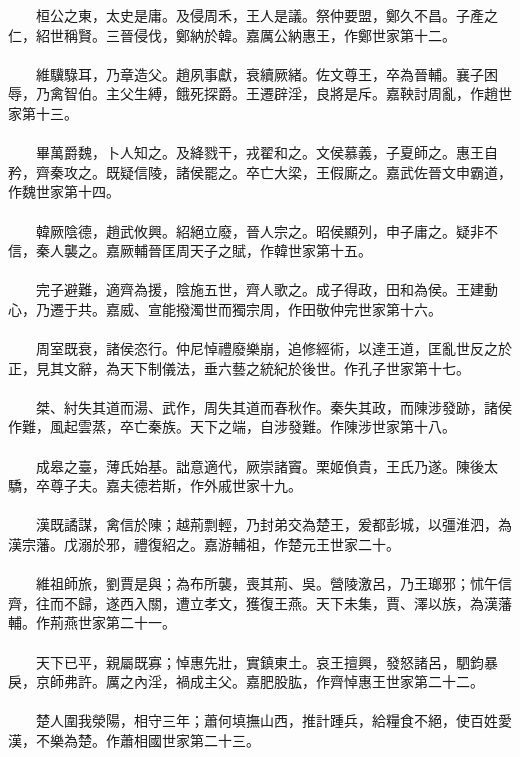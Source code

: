 　　桓公之東，太史是庸。及侵周禾，王人是議。祭仲要盟，鄭久不昌。子產之仁，紹世稱賢。三晉侵伐，鄭納於韓。嘉厲公納惠王，作鄭世家第十二。
\\\\
　　維驥騄耳，乃章造父。趙夙事獻，衰續厥緒。佐文尊王，卒為晉輔。襄子困辱，乃禽智伯。主父生縛，餓死探爵。王遷辟淫，良將是斥。嘉鞅討周亂，作趙世家第十三。
\\\\
　　畢萬爵魏，卜人知之。及絳戮干，戎翟和之。文侯慕義，子夏師之。惠王自矜，齊秦攻之。既疑信陵，諸侯罷之。卒亡大梁，王假廝之。嘉武佐晉文申霸道，作魏世家第十四。
\\\\
　　韓厥陰德，趙武攸興。紹絕立廢，晉人宗之。昭侯顯列，申子庸之。疑非不信，秦人襲之。嘉厥輔晉匡周天子之賦，作韓世家第十五。
\\\\
　　完子避難，適齊為援，陰施五世，齊人歌之。成子得政，田和為侯。王建動心，乃遷于共。嘉威、宣能撥濁世而獨宗周，作田敬仲完世家第十六。
\\\\
　　周室既衰，諸侯恣行。仲尼悼禮廢樂崩，追修經術，以達王道，匡亂世反之於正，見其文辭，為天下制儀法，垂六藝之統紀於後世。作孔子世家第十七。
\\\\
　　桀、紂失其道而湯、武作，周失其道而春秋作。秦失其政，而陳涉發跡，諸侯作難，風起雲蒸，卒亡秦族。天下之端，自涉發難。作陳涉世家第十八。
\\\\
　　成皋之臺，薄氏始基。詘意適代，厥崇諸竇。栗姬偩貴，王氏乃遂。陳後太驕，卒尊子夫。嘉夫德若斯，作外戚世家十九。
\\\\
　　漢既譎謀，禽信於陳；越荊剽輕，乃封弟交為楚王，爰都彭城，以彊淮泗，為漢宗藩。戊溺於邪，禮復紹之。嘉游輔祖，作楚元王世家二十。
\\\\
　　維祖師旅，劉賈是與；為布所襲，喪其荊、吳。營陵激呂，乃王瑯邪；怵午信齊，往而不歸，遂西入關，遭立孝文，獲復王燕。天下未集，賈、澤以族，為漢藩輔。作荊燕世家第二十一。
\\\\
　　天下已平，親屬既寡；悼惠先壯，實鎮東土。哀王擅興，發怒諸呂，駟鈞暴戾，京師弗許。厲之內淫，禍成主父。嘉肥股肱，作齊悼惠王世家第二十二。
\\\\
　　楚人圍我滎陽，相守三年；蕭何填撫山西，推計踵兵，給糧食不絕，使百姓愛漢，不樂為楚。作蕭相國世家第二十三。
\\\\
